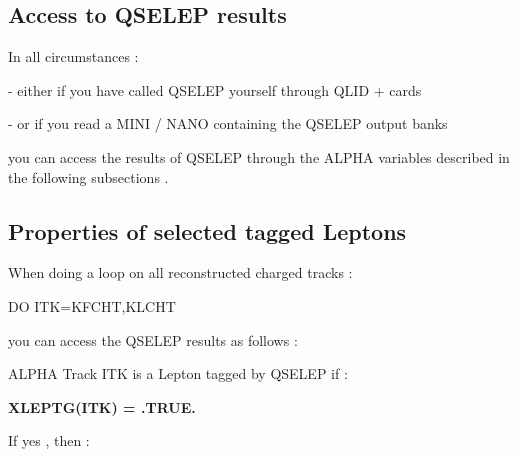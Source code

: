\subsection{\label{sec-QSELRS}Access to QSELEP results }
\par
         In all circumstances :
 
           - either if you have called QSELEP yourself through QLID + cards
 
           - or if you read a MINI / NANO containing the QSELEP output banks
 
         you can access the results of QSELEP through the ALPHA variables
         described in the following subsections .
 
\subsection{\label{sec-QSELTL}Properties of selected tagged Leptons }
\par
              When doing a loop on all reconstructed charged tracks :
 
                    DO ITK=KFCHT,KLCHT
 
              you can access the QSELEP results as follows :
 
      ALPHA Track ITK is a Lepton tagged by QSELEP if :
 
           {\bf XLEPTG(ITK) = .TRUE.}
 
          If yes , then :
 
